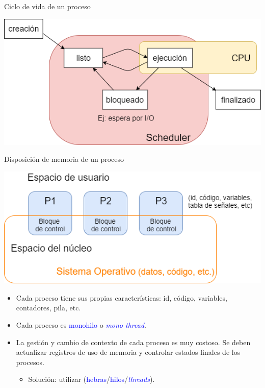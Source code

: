 \documentclass[handout]{beamer} %
\newcommand{\blue}[1]{\textcolor{blue}{#1}}
\newcommand{\redb}[1]{{\color{red!70!black}{#1}}}
\begin{document}
\begin{frame}{Ciclo de vida de un proceso}
    \begin{center}
        \includegraphics[width=.9\textwidth]{./image/cap7/ciclo-vida.png}
    \end{center}
\end{frame}

\begin{frame}{Disposición de memoria de un proceso}
    \begin{center}
        \includegraphics[width=.8\textwidth]{./image/cap7/espacios-procesos.png}
    \end{center}
    \begin{itemize}
        \item<2-> Cada proceso tiene sus propias características: id, código, variables, contadores, pila, etc.
        \item<3-> Cada proceso es \blue{monohilo} o \blue{\em mono thread}.
        \item<4-> La gestión y cambio de contexto de cada proceso es muy costoso. Se deben actualizar registros de uso de memoria y controlar estados finales de los procesos.
        \begin{itemize}
            \item<5-> Solución: utilizar \redb{procesos de procesos} (\blue{hebras}/\blue{hilos}/\blue{\em threads}).
        \end{itemize}
    \end{itemize}
\end{frame}
\end{document}
